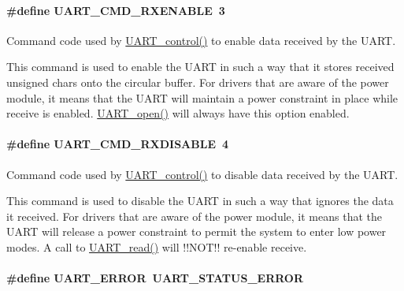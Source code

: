 \paragraph[{U\+A\+R\+T\+\_\+\+C\+M\+D\+\_\+\+R\+X\+E\+N\+A\+B\+L\+E}]{\setlength{\rightskip}{0pt plus 5cm}\#define U\+A\+R\+T\+\_\+\+C\+M\+D\+\_\+\+R\+X\+E\+N\+A\+B\+L\+E~3}\label{_u_a_r_t_8h_ad67d01fa376f25bb28141d819647e8d3}


Command code used by \hyperlink{_u_a_r_t_8h_a9de3c26cfe4ce6b7f350a6ea6e16801d}{U\+A\+R\+T\+\_\+control()} to enable data received by the U\+A\+R\+T. 

This command is used to enable the U\+A\+R\+T in such a way that it stores received unsigned chars onto the circular buffer. For drivers that are aware of the power module, it means that the U\+A\+R\+T will maintain a power constraint in place while receive is enabled. \hyperlink{_u_a_r_t_8h_a0442ea1ec23901168da31726bb3254c1}{U\+A\+R\+T\+\_\+open()} will always have this option enabled. 
\paragraph[{U\+A\+R\+T\+\_\+\+C\+M\+D\+\_\+\+R\+X\+D\+I\+S\+A\+B\+L\+E}]{\setlength{\rightskip}{0pt plus 5cm}\#define U\+A\+R\+T\+\_\+\+C\+M\+D\+\_\+\+R\+X\+D\+I\+S\+A\+B\+L\+E~4}\label{_u_a_r_t_8h_ac0b19ce2fa9f43d3fe255bcdbd3cda7b}


Command code used by \hyperlink{_u_a_r_t_8h_a9de3c26cfe4ce6b7f350a6ea6e16801d}{U\+A\+R\+T\+\_\+control()} to disable data received by the U\+A\+R\+T. 

This command is used to disable the U\+A\+R\+T in such a way that ignores the data it received. For drivers that are aware of the power module, it means that the U\+A\+R\+T will release a power constraint to permit the system to enter low power modes. A call to \hyperlink{_u_a_r_t_8h_a023152d57539cad94bdd813956013e73}{U\+A\+R\+T\+\_\+read()} will !!\+N\+O\+T!! re-\/enable receive. 
\paragraph[{U\+A\+R\+T\+\_\+\+E\+R\+R\+O\+R}]{\setlength{\rightskip}{0pt plus 5cm}\#define U\+A\+R\+T\+\_\+\+E\+R\+R\+O\+R~{\bf U\+A\+R\+T\+\_\+\+S\+T\+A\+T\+U\+S\+\_\+\+E\+R\+R\+O\+R}}\label{_u_a_r_t_8h_a7e3562e7931cf51b41a32d8109072251}
